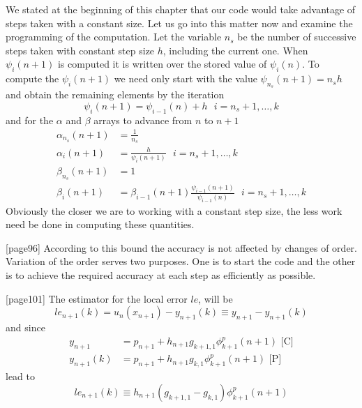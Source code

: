 We stated at the beginning of this chapter that our code would take
advantage of steps taken with a constant size. Let us go into this matter
now and examine the programming of the computation.
Let the variable $n_s$ be the number of successive steps taken with constant 
step size $h$, including the current one. When $\psi _i(n+1)$ is computed it is 
written over the stored value of $\psi _i(n)$.
To compute the $\psi _{i}(n+1)$ we need only start with the value 
$\psi _{n_s}(n+1) = n_s h$ and obtain the remaining elements by the iteration 
\begin{equation}
    \psi _{i}(n+1) = \psi _{i-1}(n) + h \text{ } i= n_s+1 , \dots , k
\end{equation}
and for the $\alpha$ and $\beta$ arrays to advance from $n$ to $n+1$
\begin{equation}
    \begin{aligned}
        \alpha _{n_s} (n+1) &= \frac{1}{n_s} \\
        \alpha _{i} (n+1)   &= \frac{h}{\psi _i(n+1)} \text{ } i= n_s+1, \dots ,k \\
        \beta _{n_s} (n+1)  &= 1 \\
        \beta _{i} (n+1)    &= \beta _{i-1} (n+1) \frac{\psi _{i-1}(n+1)}{\psi _{i-1}(n)} 
            \text{ } i= n_s +1 , \dots ,k
    \end{aligned}
\end{equation}
Obviously the closer we are to working with a constant step size, the less
work need be done in computing these quantities.




[page96]
According to this bound the accuracy is not affected by changes of order.
Variation of the order serves two purposes. One is to start the code and the
other is to achieve the required accuracy at each step as efficiently as
possible.

[page101]
The estimator for the local error $le$, will be
\begin{equation}
  le_{n+1} (k) = u_{n} (x_{n+1}) - y_{n+1}(k) \equiv y_{n+1} - y_{n+1} (k)
\end{equation}
and since
\begin{equation}
  \begin{aligned}
    y_{n+1}    &= p_{n+1} + h_{n+1} g_{k+1,1} \phi ^{p}_{k+1} (n+1) \text{ [C]}\\
    y_{n+1}(k) &= p_{n+1} + h_{n+1} g_{k,1} \phi ^{p}_{k+1} (n+1)  \text{ [P]}
  \end{aligned}
\end{equation}
lead to 
\begin{equation}
  le_{n+1} (k) \equiv h_{n+1} \left( g_{k+1,1} - g_{k,1} \right) \phi ^{p}_{k+1} (n+1)
\end{equation}
\fi
